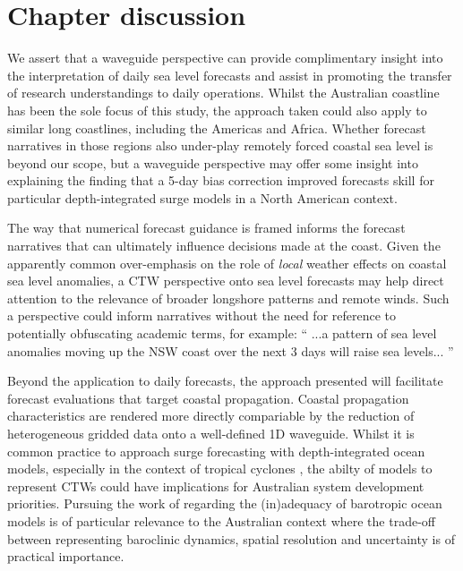 \section{Chapter discussion}
We assert that a waveguide perspective can provide complimentary insight into the interpretation of daily sea level forecasts and assist in promoting the transfer of research understandings to daily operations.  
Whilst the Australian coastline has been the sole focus of this study, the approach taken could also apply to similar long coastlines, including the Americas and Africa. Whether forecast narratives in those regions also under-play remotely forced coastal sea level is beyond our scope, but a waveguide perspective may offer some insight into explaining the \citet{DiLiberto:2011dya} finding that a 5-day bias correction improved forecasts skill for particular depth-integrated surge models in a North American context.


The way that numerical forecast guidance is framed informs the forecast narratives that can ultimately influence decisions made at the coast.
Given the apparently common over-emphasis on the role of \emph{local} weather effects on coastal sea level anomalies, a CTW perspective onto sea level forecasts may help direct attention to the relevance of broader longshore patterns and remote winds.
Such a perspective could inform narratives without the need for reference to potentially obfuscating academic terms, for example:
``
...a pattern of sea level anomalies moving up the NSW coast over the next 3 days will raise sea levels... 
''

Beyond the application to daily forecasts, the approach presented will facilitate forecast evaluations that target coastal propagation.
Coastal propagation characteristics are rendered more directly compariable by the reduction of heterogeneous gridded data onto a well-defined 1D waveguide. 
Whilst it is common practice to approach surge forecasting with depth-integrated ocean models, especially in the context of tropical cyclones \citep{Veeramony:2017}, the abilty of models to represent CTWs could have implications for Australian system development priorities. 
Pursuing the work of \citet{Hetzel:2018hh} regarding the (in)adequacy of barotropic ocean models is of particular relevance to the Australian context where the trade-off between representing baroclinic dynamics, spatial resolution and uncertainty is of practical importance.  
     

